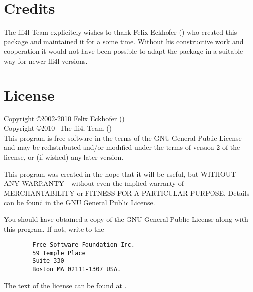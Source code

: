 \section{Credits}

The fli4l-Team explicitely wishes to thank Felix Eckhofer ()
 who created this package and
maintained it for a some time. Without his constructive work and
cooperation it would not have been possible to adapt the package
in a suitable way for newer fli4l versions.

\section{License}

Copyright \copyright  2002-2010 Felix Eckhofer () \\
Copyright \copyright  2010-     The fli4l-Team () \\

This program is free software in the terms of the GNU General Public License
and may be redistributed and/or modified under the terms of version 2 of the
license, or (if wished) any later version.

This program was created in the hope that it will be useful,
but WITHOUT ANY WARRANTY - without even the implied warranty
of MERCHANTABILITY or FITNESS FOR A PARTICULAR PURPOSE.
Details can be found in the GNU General Public License.

You should have obtained a copy of the GNU General Public License along
with this program. If not, write to the

\begin{verbatim}
		Free Software Foundation Inc.
		59 Temple Place
		Suite 330
		Boston MA 02111-1307 USA.
\end{verbatim}

The text of the license can be found at .
